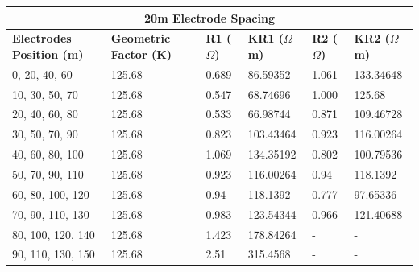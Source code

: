 \documentclass[12pt,a4paper]{report}
\begin{document}
\begin{table}[H]
    \centering
    \begin{adjustbox}{max width=\textwidth}
    \setlength{\tabcolsep}{15pt}
    \renewcommand{\arraystretch}{1.5}
    \begin{tabular}{|p{3.0cm}|p{2.5cm}|p{1.8cm}|p{3.5cm}|p{1.8cm}|p{3.5cm}|}
    \hline
    \multicolumn{6}{|c|}{\rule{0pt}{2em}\huge\textbf{20m Electrode Spacing}} \\
    \hline
    \textbf{Electrodes Position (m)} & \textbf{Geometric Factor (K)} & \textbf{R1 ($\Omega$)} & \textbf{KR1 ($\Omega$m)} & \textbf{R2 ($\Omega$)} & \textbf{KR2 ($\Omega$m)}  \\ \hline
    0, 20, 40, 60 & 125.68 & 0.689 & 86.59352 & 1.061 & 133.34648 \\ \hline
    10, 30, 50, 70 & 125.68 & 0.547 & 68.74696 & 1.000 & 125.68 \\ \hline
    20, 40, 60, 80 & 125.68 & 0.533 & 66.98744 & 0.871 & 109.46728 \\ \hline
    30, 50, 70, 90 & 125.68 & 0.823 & 103.43464 & 0.923 & 116.00264 \\ \hline
    40, 60, 80, 100 & 125.68 & 1.069 & 134.35192 & 0.802 & 100.79536 \\ \hline
    50, 70, 90, 110 & 125.68 & 0.923 & 116.00264 & 0.94 & 118.1392 \\ \hline
    60, 80, 100, 120 & 125.68 & 0.94 & 118.1392 & 0.777 & 97.65336 \\ \hline
    70, 90, 110, 130 & 125.68 & 0.983 & 123.54344 & 0.966 & 121.40688 \\ \hline
    80, 100, 120, 140 & 125.68 & 1.423 & 178.84264 & - & - \\ \hline
    90, 110, 130, 150 & 125.68 & 2.51 & 315.4568 & - & - \\ \hline
    \end{tabular}
\end{adjustbox}
\end{table}
\end{document}
